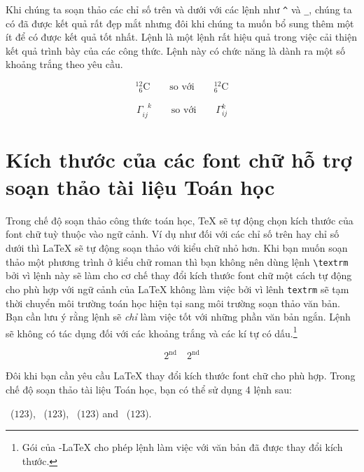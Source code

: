 Khi chúng ta soạn thảo các chỉ số trên và dưới với các lệnh như \verb|^| và \verb|_|, chúng ta có đã được kết quả rất đẹp mắt nhưng đôi khi chúng ta muốn bổ sung thêm một ít để có được kết quả tốt nhất. Lệnh  là một lệnh rất hiệu quả trong việc cải thiện kết quả trình bày của các công thức. Lệnh này có chức năng là dành ra một số khoảng trắng theo yêu cầu.

\begin{example}
\begin{displaymath}
{}^{12}_{\phantom{1}6}\textrm{C}
\qquad \textrm{so với} \qquad
{}^{12}_{6}\textrm{C}
\end{displaymath}
\end{example}

\begin{example}
\begin{displaymath}
\Gamma_{ij}^{\phantom{ij}k} \qquad
\textrm{so với} \qquad
\Gamma_{ij}^{k}
\end{displaymath}
\end{example}

\section[Kích thước của các font chữ]{Kích thước của các font chữ hỗ trợ soạn thảo tài liệu Toán học}\label{sec:fontsz}
 Trong chế độ soạn thảo công thức toán học, \TeX{} sẽ tự động chọn kích thước của font chữ tuỳ thuộc vào ngữ cảnh. Ví dụ như đối với các chỉ số trên hay chỉ số dưới thì \LaTeX{} sẽ tự động soạn thảo với kiểu chữ nhỏ hơn. Khi bạn muốn soạn thảo một phương trình ở kiểu chữ roman thì bạn không nên dùng lệnh \verb|\textrm| bởi vì lệnh này sẽ làm cho cơ chế thay đổi kích thước font chữ một cách tự động cho phù hợp với ngữ cảnh của \LaTeX{} không làm việc bởi vì lênh \verb|textrm| sẽ tạm thời chuyển môi trường toán học hiện tại sang môi trường soạn thảo văn bản. Bạn cần lưu ý rằng lệnh  sẽ \emph{chỉ} làm việc tốt với những phần văn bản ngắn. Lệnh  sẽ không có tác dụng đối với các khoảng trắng và các kí tự có dấu.\footnote{Gói  của \AmS-\LaTeX{} cho phép lệnh  làm việc với văn bản đã được thay đổi kích thước.}

\begin{example}
\begin{equation} 2^{\textrm{nd}}
\quad 2^{\mathrm{nd}}
\end{equation}
\end{example}
Đôi khi bạn cần yêu cầu \LaTeX{} thay đổi kích thước font chữ cho phù hợp. Trong chế độ soạn thảo tài liệu Toán học, bạn có thể sử dụng 4 lệnh sau:
\begin{flushleft}
~($\displaystyle 123$),
 ~($\textstyle 123$),
~($\scriptstyle 123$) and
~($\scriptscriptstyle 123$).
\end{flushleft}

